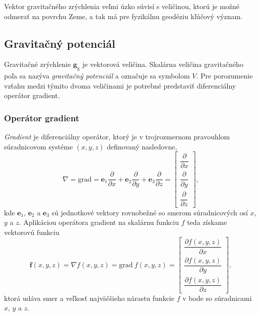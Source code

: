 \documentclass[a4paper, 12pt]{book}
\newcommand{\grad}{\mathrm{grad}}
\newcommand{\gidx}{\mathrm g}
\let\vec\mathbf
\begin{document}
Vektor gravitačného zrýchlenia veľmi úzko súvisí s veličinou, ktorú je možné 
odmerať na povrchu Zeme, a tak má pre fyzikálnu geodéziu kľúčový význam.

\subsection{Gravitačný potenciál}

Gravitačné zrýchlenie $\vec g_\gidx$ je vektorová veličina.  Skalárna veličina 
gravitačného poľa sa nazýva \emph{gravitačný potenciál} a označuje sa symbolom 
$V$.  Pre porozumenie vzťahu medzi týmito dvoma veličinami je potrebné 
predstaviť diferenciálny operátor gradient.

\subsubsection{Operátor gradient}

\emph{Gradient} je diferenciálny operátor, ktorý je v trojrozmernom pravouhlom 
súradnicovom systéme $(x, y, z)$ definovaný nasledovne,
%
\begin{equation}
\label{eq:gradient}
\nabla = \grad = \vec e_1 \frac{\partial}{\partial x} + \vec e_2 
\frac{\partial}{\partial y} + \vec e_3 \frac{\partial}{\partial z} =
\begin{bmatrix}
\dfrac{\partial}{\partial x} \\[2ex]
\dfrac{\partial}{\partial y} \\[2ex]
\dfrac{\partial}{\partial z}
\end{bmatrix}
{,}
\end{equation}
%
kde $\vec e_1$, $\vec e_2$ a $\vec e_3$ sú jednotkové vektory rovnobežné so 
smerom súradnicových osí $x$, $y$ a $z$.  Aplikáciou operátora gradient na 
skalárnu funkciu $f$ teda získame vektorovú funkciu
%
\begin{equation}
\vec f(x, y, z) = \nabla f(x, y, z) = \grad \ f(x, y, z) = \begin{bmatrix}
\dfrac{\partial f(x, y, z)}{\partial x} \\[2ex]
\dfrac{\partial f(x, y, z)}{\partial y} \\[2ex]
\dfrac{\partial f(x, y, z)}{\partial z}
\end{bmatrix}
{,}
\end{equation}
%
ktorá udáva smer a veľkosť najväčšieho nárastu funkcie $f$ v bode so 
súradnicami $x$, $y$ a $z$.
\end{document}
